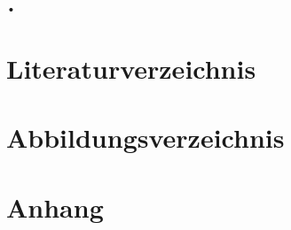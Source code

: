 \begin{flushleft}
•
\end{flushleft}%
\section{Literaturverzeichnis}
\section{Abbildungsverzeichnis}
\section{Anhang}
